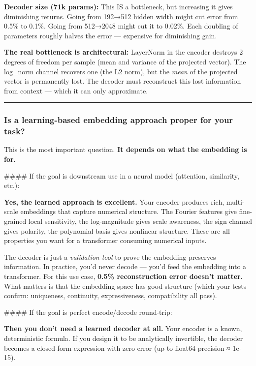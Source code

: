 \documentclass[11pt]{article}
\begin{document}
\textbf{Decoder size (71k params):} This IS a bottleneck, but increasing it gives diminishing returns. Going from 192→512 hidden width might cut error from 0.5\% to 0.1\%. Going from 512→2048 might cut it to 0.02\%. Each doubling of parameters roughly halves the error — expensive for diminishing gain.


\textbf{The real bottleneck is architectural:} LayerNorm in the encoder destroys 2 degrees of freedom per sample (mean and variance of the projected vector). The log\_norm channel recovers one (the L2 norm), but the \emph{mean} of the projected vector is permanently lost. The decoder must reconstruct this lost information from context — which it can only approximate.


\noindent\rule{\textwidth}{0.4pt}


\subsubsection*{Is a learning-based embedding approach proper for your task?}


This is the most important question. \textbf{It depends on what the embedding is for.}


\#\#\#\# If the goal is downstream use in a neural model (attention, similarity, etc.):


\textbf{Yes, the learned approach is excellent.} Your encoder produces rich, multi-scale embeddings that capture numerical structure. The Fourier features give fine-grained local sensitivity, the log-magnitude gives scale awareness, the sign channel gives polarity, the polynomial basis gives nonlinear structure. These are all properties you want for a transformer consuming numerical inputs.


The decoder is just a \emph{validation tool} to prove the embedding preserves information. In practice, you'd never decode — you'd feed the embedding into a transformer. For this use case, \textbf{0.5\% reconstruction error doesn't matter.} What matters is that the embedding space has good structure (which your tests confirm: uniqueness, continuity, expressiveness, compatibility all pass).


\#\#\#\# If the goal is perfect encode/decode round-trip:


\textbf{Then you don't need a learned decoder at all.} Your encoder is a known, deterministic formula. If you design it to be analytically invertible, the decoder becomes a closed-form expression with zero error (up to float64 precision ≈ 1e-15).
\end{document}
